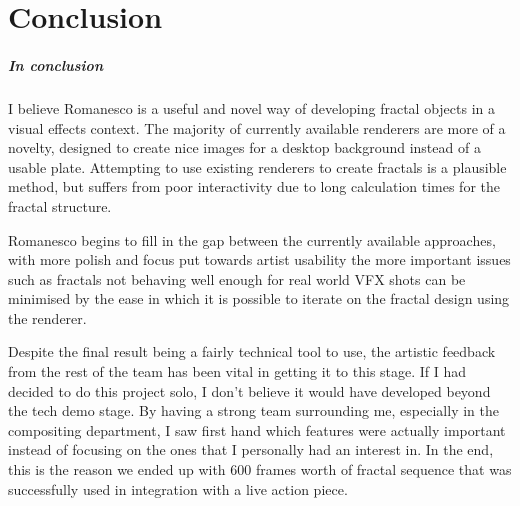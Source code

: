\documentclass[11pt,a4paper,final,notitlepage]{report}
\begin{document}
\chapter{Conclusion}

\paragraph{In conclusion} I believe Romanesco is a useful and novel way of developing fractal objects in a visual effects context. The majority of currently available renderers are more of a novelty, designed to create nice images for a desktop background instead of a usable plate. Attempting to use existing renderers to create fractals is a plausible method, but suffers from poor interactivity due to long calculation times for the fractal structure.

Romanesco begins to fill in the gap between the currently available approaches, with more polish and focus put towards artist usability the more important issues such as fractals not behaving well enough for real world VFX shots can be minimised by the ease in which it is possible to iterate on the fractal design using the renderer.

Despite the final result being a fairly technical tool to use, the artistic feedback from the rest of the team has been vital in getting it to this stage. If I had decided to do this project solo, I don't believe it would have developed beyond the tech demo stage. By having a strong team surrounding me, especially in the compositing department, I saw first hand which features were actually important instead of focusing on the ones that I personally had an interest in. In the end, this is the reason we ended up with 600 frames worth of fractal sequence that was successfully used in integration with a live action piece.


\nocite{*}



\end{document}
